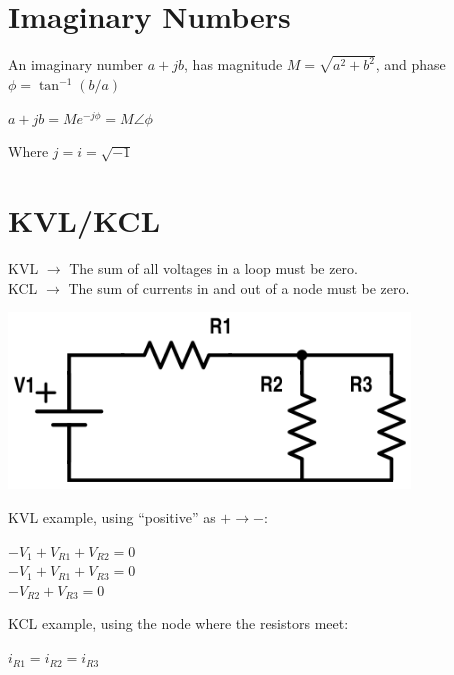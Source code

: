\documentclass[12pt]{article}
\begin{document}

\section*{Imaginary Numbers}
An imaginary number $a+jb$, has magnitude $M = \sqrt{a^2+b^2}$, and phase $\phi = \tan^{-1}(b/a)$\\

\begin{center}
	$a+jb = Me^{-j\phi} = M\angle\phi $
\end{center}
Where $j = i = \sqrt{-1}$


\section*{KVL/KCL}
KVL $\rightarrow$ The sum of all voltages in a loop must be zero. \\
KCL $\rightarrow$ The sum of currents in and out of a node must be zero. \\

\begin{center}
	\includegraphics[width=0.8\textwidth]{assets/ece210-kvl.png}
\end{center}

KVL example, using ``positive'' as $+\rightarrow-$:
\begin{center}
	$-V_1 + V_{R1} + V_{R2} = 0$\\
	$-V_1 + V_{R1} + V_{R3} = 0$\\
	$-V_{R2} + V_{R3} = 0$
\end{center}

KCL example, using the node where the resistors meet:
\begin{center}
	$i_{R1} = i_{R2} = i_{R3}$
\end{center}


\end{document}
